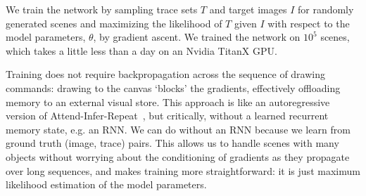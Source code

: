 \documentclass{article}
\newcommand{\probability}{\mathds{P}} %
\theoremstyle{definition}
\begin{document}

We train the network by sampling trace sets $T$ and target
images $I$ for randomly generated scenes
and maximizing
the likelihood of $T$ given $I$ with respect to
the model parameters, $\theta$,
  by gradient ascent.
We trained the network on $10^5$ scenes, which takes a little less than a day on an Nvidia TitanX GPU.

Training does not require backpropagation across the sequence
of drawing commands: drawing to the canvas `blocks' the gradients,
effectively offloading memory to an external visual store.  
This approach is like an autoregressive version of
Attend-Infer-Repeat~\citep{eslami1603attend}, but critically, without a learned
  recurrent memory state, e.g. an RNN.  We can do without an RNN
because we learn from ground truth (image, trace) pairs.  This
allows us to handle scenes with many objects without
worrying about the conditioning of gradients as they propagate
over long sequences, and makes training more straightforward: it
is just maximum likelihood estimation of the model parameters.
\end{document}
